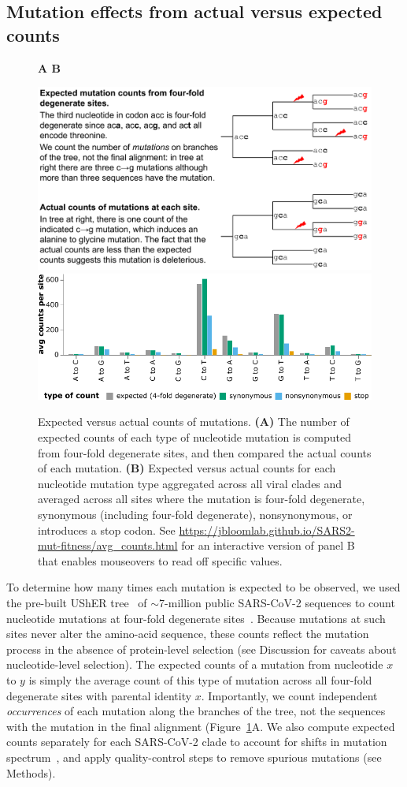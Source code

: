 \documentclass[9pt,twocolumn,twoside]{gsajnl_modified}
\begin{document}
\subsection{Mutation effects from actual versus expected counts}

\begin{figure}
{\bf \Large A \hspace{0.47\linewidth} B}

\includegraphics[width=0.48\linewidth,valign=t]{figs/schematic/schematic.pdf}
\hspace{0.02\linewidth}
\includegraphics[width=0.5\linewidth,valign=t]{figs/avg_counts.pdf}
\caption{
Expected versus actual counts of mutations.
{\bf (A)}
The number of expected counts of each type of nucleotide mutation is computed from four-fold degenerate sites, and then compared the actual counts of each mutation.
{\bf (B)}
Expected versus actual counts for each nucleotide mutation type aggregated across all viral clades and averaged across all sites where the mutation is four-fold degenerate, synonymous (including four-fold degenerate), nonsynonymous, or introduces a stop codon.
See \url{https://jbloomlab.github.io/SARS2-mut-fitness/avg_counts.html} for an interactive version of panel B that enables mouseovers to read off specific values.
\label{fig:expected_vs_actual}
}
\end{figure}

To determine how many times each mutation is expected to be observed, we used the pre-built UShER tree~\citep{mcbroome2021daily,turakhia2021ultrafast,lanfear2020} of $\sim$7-million public SARS-CoV-2 sequences to count nucleotide mutations at four-fold degenerate sites~\citep[Figure~\ref{fig:expected_vs_actual}A;][]{bloom2022evolution}.
Because mutations at such sites never alter the amino-acid sequence, these counts reflect the mutation process in the absence of protein-level selection (see Discussion for caveats about nucleotide-level selection).
The expected counts of a mutation from nucleotide $x$ to $y$ is simply the average count of this type of mutation across all four-fold degenerate sites with parental identity $x$.
Importantly, we count independent \emph{occurrences} of each mutation along the branches of the tree, not the sequences with the mutation in the final alignment (Figure~\ref{fig:expected_vs_actual}A.
We also compute expected counts separately for each SARS-CoV-2 clade to account for shifts in mutation spectrum~\citep{bloom2022evolution,ruis2022mutational}, and apply quality-control steps to remove spurious mutations (see Methods).
\end{document}

